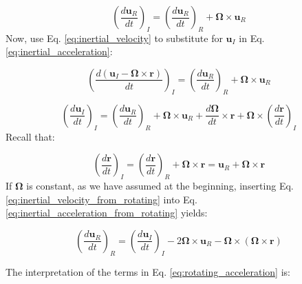 \documentclass[12pt]{article}
\numberwithin{equation}{section}
\numberwithin{figure}{section}
\numberwithin{table}{section}
\begin{document}
\begin{equation}
  \left( \frac{d\mathbf{u}_R}{dt} \right)_I = \left( \frac{d\mathbf{u}_R}{dt} \right)_R + \mathbf{\Omega} \times \mathbf{u}_R
  \label{eq:inertial_acceleration}
\end{equation}
Now, use Eq. \ref{eq:inertial_velocity} to substitute for $\mathbf{u}_I$ in
Eq. \ref{eq:inertial_acceleration}:

\begin{equation}
  \left( \frac{d\left(\mathbf{u}_I - \mathbf{\Omega} \times \mathbf{r}\right)}{dt} \right)_I = 
  \left( \frac{d\mathbf{u}_R}{dt} \right)_R + \mathbf{\Omega} \times \mathbf{u}_R
\end{equation}

\begin{equation}
  \left( \frac{d \mathbf{u}_I}{dt} \right)_I =
  \left( \frac{d \mathbf{u}_R}{dt} \right)_R +
  \mathbf{\Omega} \times \mathbf{u}_R +
  \frac{d\mathbf{\Omega}}{dt} \times \mathbf{r} +
  \mathbf{\Omega} \times \left( \frac{d\mathbf{r}}{dt} \right)_I
  \label{eq:inertial_acceleration_from_rotating}
\end{equation}
Recall that:

\begin{equation}
  \left( \frac{d \mathbf{r}}{dt} \right)_I =
  \left( \frac{d \mathbf{r}}{dt} \right)_R +
  \mathbf{\Omega} \times \mathbf{r} =
  \mathbf{u}_R + \mathbf{\Omega} \times \mathbf{r}
  \label{eq:inertial_velocity_from_rotating}
\end{equation}
If $\mathbf{\Omega}$ is constant, as we have assumed at the beginning,
inserting Eq. \ref{eq:inertial_velocity_from_rotating} into Eq.
\ref{eq:inertial_acceleration_from_rotating} yields:

\begin{equation}
  \left( \frac{d \mathbf{u}_R}{dt} \right)_R =
  \left( \frac{d \mathbf{u}_I}{dt} \right)_I -
  2 \mathbf{\Omega} \times \mathbf{u}_R -
  \mathbf{\Omega} \times \left( \mathbf{\Omega} \times \mathbf{r} \right)
  \label{eq:rotating_acceleration}
\end{equation}

The interpretation of the terms in Eq. \ref{eq:rotating_acceleration} is:
\end{document}
